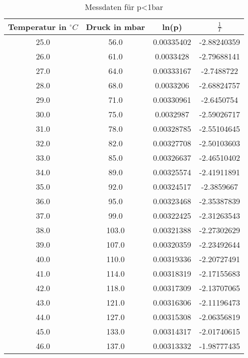 \documentclass[
  captions=tableheading,
]{scrartcl}
\begin{document}
\begin{table}
  \caption{Messdaten für p<1bar}

  \label{tab:Messdaten1}

\begin{tabular}{c c c c}
  \toprule
  {Temperatur in $^\circ C$}& {Druck in mbar}&{ln(p)}&{$\frac{1}{T}$}\\


 \midrule

25.0    &    56.0    &    0.00335402    &    -2.88240359\\
26.0    &    61.0    &    0.0033428     &    -2.79688141\\
27.0    &    64.0    &    0.00333167    &    -2.7488722\\
28.0    &    68.0    &    0.0033206     &    -2.68824757\\
29.0    &    71.0    &    0.00330961    &    -2.6450754\\
30.0    &    75.0    &    0.0032987     &    -2.59026717\\
31.0    &    78.0    &    0.00328785    &    -2.55104645\\
32.0    &    82.0    &    0.00327708    &    -2.50103603\\
33.0    &    85.0    &    0.00326637    &    -2.46510402\\
34.0    &    89.0    &    0.00325574    &    -2.41911891\\
35.0    &    92.0    &    0.00324517    &    -2.3859667\\
36.0    &    95.0    &    0.00323468    &    -2.35387839\\
37.0    &    99.0    &    0.00322425    &    -2.31263543\\
38.0    &    103.0   &    0.00321388    &    -2.27302629\\
39.0    &    107.0   &    0.00320359    &    -2.23492644\\
40.0    &    110.0   &    0.00319336    &    -2.20727491\\
41.0    &    114.0   &    0.00318319    &    -2.17155683\\
42.0    &    118.0   &    0.00317309    &    -2.13707065\\
43.0    &    121.0   &    0.00316306    &    -2.11196473\\
44.0    &    127.0   &    0.00315308    &    -2.06356819\\
45.0    &    133.0   &    0.00314317    &    -2.01740615\\
46.0    &    137.0   &    0.00313332    &    -1.98777435\\

\end{tabular}
\end{table}
\end{document}

